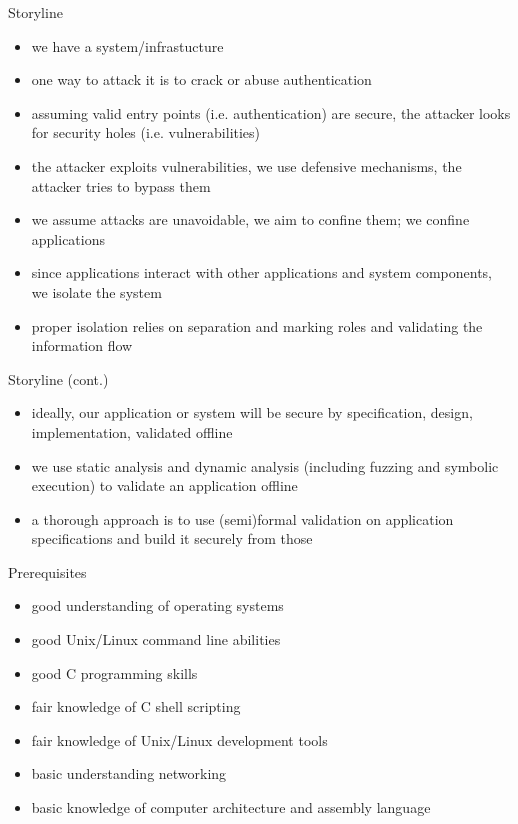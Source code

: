 \documentclass{curs}
\begin{document}
\begin{frame}{Storyline}
  \begin{itemize}
    \pause \item we have a system/infrastucture
    \pause \item one way to attack it is to crack or abuse authentication
    \pause \item assuming valid entry points (i.e. authentication) are secure, the attacker looks for security holes (i.e. vulnerabilities)
    \pause \item the attacker exploits vulnerabilities, we use defensive mechanisms, the attacker tries to bypass them
    \pause \item we assume attacks are unavoidable, we aim to confine them; we confine applications
    \pause \item since applications interact with other applications and system components, we isolate the system
    \pause \item proper isolation relies on separation and marking roles and validating the information flow
  \end{itemize}
\end{frame}

\begin{frame}{Storyline (cont.)}
  \begin{itemize}
    \pause \item ideally, our application or system will be secure by specification, design, implementation, validated offline
    \pause \item we use static analysis and dynamic analysis (including fuzzing and symbolic execution) to validate an application offline
    \pause \item a thorough approach is to use (semi)formal validation on application specifications and build it securely from those
  \end{itemize}
\end{frame}

\begin{frame}{Prerequisites}
  \begin{itemize}
    \pause \item good understanding of operating systems
    \pause \item good Unix/Linux command line abilities
    \pause \item good C programming skills
    \pause \item fair knowledge of C shell scripting
    \pause \item fair knowledge of Unix/Linux development tools
    \pause \item basic understanding networking
    \pause \item basic knowledge of computer architecture and assembly language
  \end{itemize}
\end{frame}
\end{document}
